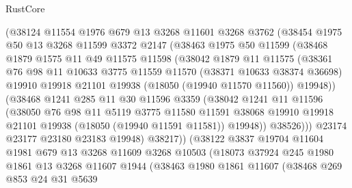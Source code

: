 \begin{lexlean}{RustCore}
\begin{coremodule}
          (@38124
            @11554
            @1976
            @679
            @13
            @3268
            @11601
            @3268
            @3762
            (@38454
              @1975
              @50
              @13
              @3268
              @11599
              @3372
              @2147
              (@38463
                @1975
                @50
                @11599
                (@38468
                  @1879
                  @1575
                  @11
                  @49
                  @11575
                  @11598
                  (@38042
                    @1879
                    @11
                    @11575
                    (@38361
                      @76
                      @98
                      @11
                      @10633
                      @3775
                      @11559
                      @11570
                      (@38371 @10633 @38374 @36698)
                      @19910
                      @19918
                      @21101
                      @19938
                      (@18050 (@19940 @11570 @11560))
                      @19948))
                  (@38468
                    @1241
                    @285
                    @11
                    @30
                    @11596
                    @3359
                    (@38042
                      @1241
                      @11
                      @11596
                      (@38050
                        @76
                        @98
                        @11
                        @5119
                        @3775
                        @11580
                        @11591
                        @38068
                        @19910
                        @19918
                        @21101
                        @19938
                        (@18050 (@19940 @11591 @11581))
                        @19948))
                    @38526)))
              @23174
              @23177
              @23180
              @23183
              @19948)
            @38217))
        (@38122
          @3837
          @19704
          @11604
          @1981
          @679
          @13
          @3268
          @11609
          @3268
          @10503
          (@18073
            @37924
            @245
            @1980
            @1861
            @13
            @3268
            @11607
            @1944
            (@38463
              @1980
              @1861
              @11607
              (@38468
                @269
                @853
                @24
                @31
                @5639

\end{coremodule}
\end{lexlean}
